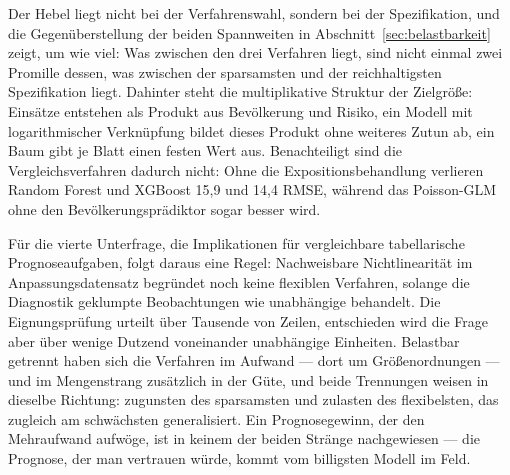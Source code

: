 \documentclass[12pt,a4paper]{article}
\begin{document}
Der Hebel liegt nicht bei der Verfahrenswahl, sondern bei der Spezifikation, und die Gegenüberstellung der beiden Spannweiten in Abschnitt~\ref{sec:belastbarkeit} zeigt, um wie viel: Was zwischen den drei Verfahren liegt, sind nicht einmal zwei Promille dessen, was zwischen der sparsamsten und der reichhaltigsten Spezifikation liegt. Dahinter steht die multiplikative Struktur der Zielgröße: Einsätze entstehen als Produkt aus Bevölkerung und Risiko, ein Modell mit logarithmischer Verknüpfung bildet dieses Produkt ohne weiteres Zutun ab, ein Baum gibt je Blatt einen festen Wert aus. Benachteiligt sind die Vergleichsverfahren dadurch nicht: Ohne die Expositionsbehandlung verlieren Random Forest und XGBoost 15,9 und 14,4 RMSE, während das Poisson-GLM ohne den Bevölkerungsprädiktor sogar besser wird.

Für die vierte Unterfrage, die Implikationen für vergleichbare tabellarische Prognoseaufgaben, folgt daraus eine Regel: Nachweisbare Nichtlinearität im Anpassungsdatensatz begründet noch keine flexiblen Verfahren, solange die Diagnostik geklumpte Beobachtungen wie unabhängige behandelt. Die Eignungsprüfung urteilt über Tausende von Zeilen, entschieden wird die Frage aber über wenige Dutzend voneinander unabhängige Einheiten. Belastbar getrennt haben sich die Verfahren im Aufwand --- dort um Größenordnungen --- und im Mengenstrang zusätzlich in der Güte, und beide Trennungen weisen in dieselbe Richtung: zugunsten des sparsamsten und zulasten des flexibelsten, das zugleich am schwächsten generalisiert. Ein Prognosegewinn, der den Mehraufwand aufwöge, ist in keinem der beiden Stränge nachgewiesen --- die Prognose, der man vertrauen würde, kommt vom billigsten Modell im Feld.
\end{document}
